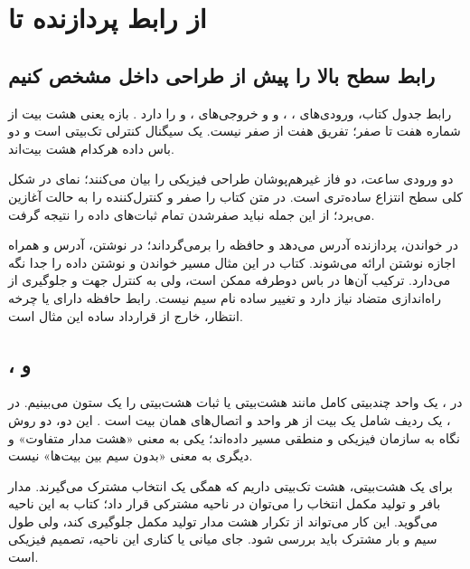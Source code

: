 \section{از رابط پردازنده تا }
\subsection{رابط سطح بالا را پیش از طراحی داخل مشخص کنیم}
رابط جدول  کتاب، ورودی‌های ، ،
 و  و خروجی‌های ،
 و  را دارد
\cite[بخش ]{weste}.
بازه \code{[7:0]} یعنی هشت بیت از شماره هفت تا صفر؛ تفریق هفت از صفر نیست.
 یک سیگنال کنترلی تک‌بیتی است و دو باس داده هرکدام هشت بیت‌اند.

دو ورودی ساعت، دو فاز غیرهم‌پوشان طراحی فیزیکی را بیان می‌کنند؛
نمای  در شکل کلی  سطح انتزاع ساده‌تری است.
 در متن کتاب  را صفر و کنترل‌کننده را به حالت آغازین می‌برد؛
از این جمله نباید صفرشدن تمام ثبات‌های داده را نتیجه گرفت.

در خواندن، پردازنده آدرس می‌دهد و حافظه  را برمی‌گرداند؛
در نوشتن، آدرس و  همراه اجازه نوشتن ارائه می‌شوند.
کتاب در این مثال مسیر خواندن و نوشتن داده را جدا نگه می‌دارد.
ترکیب آن‌ها در باس دوطرفه ممکن است، ولی به کنترل جهت و جلوگیری از
راه‌اندازی متضاد نیاز دارد و تغییر ساده نام سیم نیست.
رابط حافظه دارای  یا چرخه انتظار، خارج از قرارداد ساده این مثال است.

\subsection{،  و }
در ، یک واحد چندبیتی کامل مانند  هشت‌بیتی یا ثبات
هشت‌بیتی را یک ستون می‌بینیم. در ، یک ردیف شامل یک بیت
از هر واحد و اتصال‌های همان بیت است
\cite[بخش  و شکل ]{weste}.
این دو، دو روش نگاه به سازمان فیزیکی و منطقی مسیر داده‌اند؛
یکی به معنی «هشت مدار متفاوت» و دیگری به معنی «بدون سیم بین بیت‌ها» نیست.

برای یک  هشت‌بیتی، هشت  تک‌بیتی داریم که همگی یک
انتخاب مشترک می‌گیرند. مدار بافر و تولید مکمل انتخاب را می‌توان در ناحیه مشترکی
قرار داد؛ کتاب به این ناحیه  می‌گوید.
این کار می‌تواند از تکرار هشت مدار تولید مکمل جلوگیری کند،
ولی طول سیم و بار مشترک باید بررسی شود. جای میانی یا کناری این ناحیه، تصمیم فیزیکی است.

